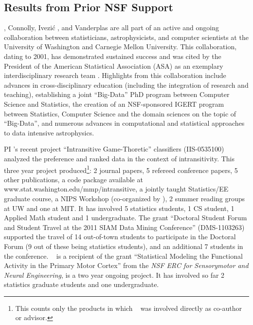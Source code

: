 \subsection{             Results from Prior NSF Support             }
\label{sec:priorNSF}

\meila, Connolly, Ivezi\'{c} , and Vanderplas are all part of an active
and ongoing collaboration between statisticians, astrophysicists, and
computer scientists at the University of Washington and Carnegie
Mellon University.  This collaboration, dating to 2001, has
demonstrated sustained success and was cited by the President of the
American Statistical Association (ASA) as an exemplary
interdisciplinary research team \cite{straf03}. Highlights from this
collaboration include advances in cross-disciplinary education
(including the integration of research and teaching), establishing a
joint ``Big-Data'' PhD program between Computer Science and
Statistics, the creation of an NSF-sponsored IGERT program between
Statistics, Computer Science and the domain sciences on the topic of
``Big-Data'', and numerous advances in computational and statistical
approaches to data intensive astrophysics.

PI \meila's recent project ``Intransitive Game-Thoretic'' classifiers
(IIS-0535100) analyzed the preference and ranked data in the context
of intransitivity. This three year project produced\footnote{This
  counts only the products in which \meila~ was involved directly as
  co-author or advisor.}: 2 journal papers, 5 refereed conference
papers, 5 other publications, a code package available at
{www.stat.washington.edu/mmp/intransitive}, a jointly taught
Statistics/EE graduate course, a NIPS Workshop (co-organized by
\meila), 2 summer reading groups at UW and one at MIT. It has involved
5 statistics students, 1 CS student, 1 Applied Math student and 1
undergraduate. The grant ``Doctoral Student Forum and Student Travel
at the 2011 SIAM Data Mining Conference'' (DMS-1103263) supported the
travel of 14 out-of-town students to participate in the Doctoral Forum
(9 out of these being statistics students), and an additional 7
students in the conference. 
\meila~ is a recipient of the grant ``Statistical Modeling the
Functional Activity in the Primary Motor Cortex'' from the {\em NSF
  ERC for Sensorymotor and Neural Engineering}, is a two year ongoing
project. It has involved so far 2 statistics graduate students and one
undergraduate.

